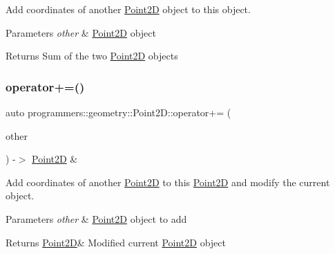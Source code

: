 Add coordinates of another \hyperlink{classprogrammers_1_1geometry_1_1Point2D}{Point2D} object to this object. 


\begin{DoxyParams}{Parameters}
{\em other} & \hyperlink{classprogrammers_1_1geometry_1_1Point2D}{Point2D} object \\
\hline
\end{DoxyParams}
\begin{DoxyReturn}{Returns}
Sum of the two \hyperlink{classprogrammers_1_1geometry_1_1Point2D}{Point2D} objects 
\end{DoxyReturn}
\mbox{\label{classprogrammers_1_1geometry_1_1Point2D_a75796b7e8ddf7b854958d7265f13a2d6}} 
\subsubsection{\texorpdfstring{operator+=()}{operator+=()}}
{\footnotesize\ttfamily auto programmers\+::geometry\+::\+Point2\+D\+::operator+= (\begin{DoxyParamCaption}\item[{const \hyperlink{classprogrammers_1_1geometry_1_1Point2D}{Point2D} \&}]{other }\end{DoxyParamCaption}) -\/$>$  \hyperlink{classprogrammers_1_1geometry_1_1Point2D}{Point2D} \&}



Add coordinates of another \hyperlink{classprogrammers_1_1geometry_1_1Point2D}{Point2D} to this \hyperlink{classprogrammers_1_1geometry_1_1Point2D}{Point2D} and modify the current object. 


\begin{DoxyParams}{Parameters}
{\em other} & \hyperlink{classprogrammers_1_1geometry_1_1Point2D}{Point2D} object to add \\
\hline
\end{DoxyParams}
\begin{DoxyReturn}{Returns}
\hyperlink{classprogrammers_1_1geometry_1_1Point2D}{Point2D}\& Modified current \hyperlink{classprogrammers_1_1geometry_1_1Point2D}{Point2D} object 
\end{DoxyReturn}
\mbox{\label{classprogrammers_1_1geometry_1_1Point2D_a3b2cf6b925ad0dd8c2b91e67e66cdab5}} 
